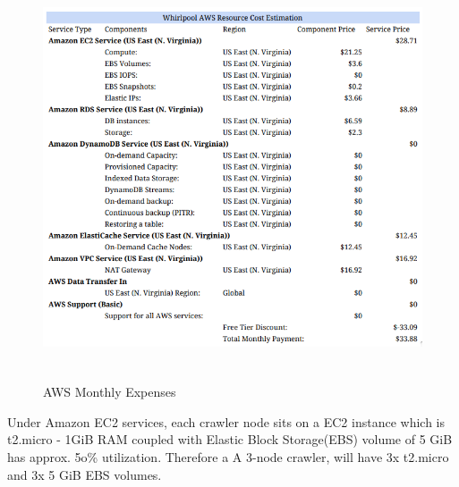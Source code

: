 \begin{figure}[h!]
  \centering
  \includegraphics[width=20cm,height=12cm,keepaspectratio]{../media/crawler/aws-cost-estimate.png}
  \caption{AWS Monthly Expenses}
  \label{fig:awscost}
\end{figure}

Under Amazon EC2 services, each crawler node sits on a EC2 instance which is t2.micro - 1GiB RAM coupled
with Elastic Block Storage(EBS) volume of 5 GiB has approx. 5o\% utilization. Therefore a A 3-node crawler, will have 3x t2.micro and 3x 5 GiB EBS volumes.
\\
\\

\pagebreak
